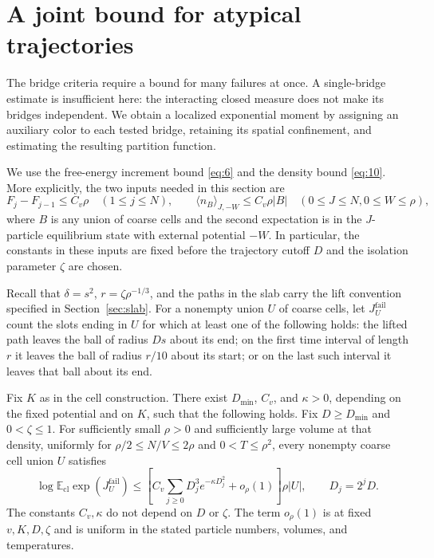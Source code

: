 \section{A joint bound for atypical trajectories}
\label{sec:atypical}

The bridge criteria require a bound for many failures at once.  A
single-bridge estimate is insufficient here: the interacting closed measure
does not make its bridges independent.  We obtain a localized exponential
moment by assigning an auxiliary color to each tested bridge, retaining its
spatial confinement, and estimating the resulting partition function.

We use the free-energy increment bound \eqref{eq:6} and the density bound
\eqref{eq:10}.  More explicitly, the two inputs needed in this section are
\[
 F_j-F_{j-1}\le C_v\rho\quad(1\le j\le N),
 \qquad
 \langle n_B\rangle_{J,-W}\le C_v\rho|B|
 \quad(0\le J\le N, 0\le W\le\rho),
\]
where $B$ is any union of coarse cells and the second expectation is in the
$J$-particle equilibrium state with external potential $-W$.  In particular,
the constants in these inputs are fixed before the trajectory cutoff $D$
and the isolation parameter $\zeta$ are chosen.

Recall that $\delta=s^2$, $r=\zeta\rho^{-1/3}$, and the paths in the slab
carry the lift convention specified in Section~\ref{sec:slab}.  For a
nonempty union $U$ of coarse cells, let $J_U^{\mathrm{fail}}$ count the
slots ending in $U$ for which at least one of the following holds: the
lifted path leaves the ball of radius $Ds$ about its end; on the first
time interval of length $r$ it leaves the ball of radius $r/10$ about
its start; or on the last such interval it leaves that ball about its
end.

\begin{proposition}
\label{prop:atypical-moment}
Fix $K$ as in the cell construction.  There exist $D_{\min}$, $C_v$, and
$\kappa>0$, depending on the fixed potential and on $K$, such that the
following holds.  Fix $D\ge D_{\min}$ and $0<\zeta\le1$.  For sufficiently
small $\rho>0$ and sufficiently large volume at that density, uniformly
for $\rho/2\le N/V\le2\rho$ and $0<T\le\rho^2$, every nonempty coarse
cell union $U$ satisfies
\begin{equation}
 \log\mathbb E_{\mathrm{cl}}\exp(J_U^{\mathrm{fail}})
 \le
 \left[C_v\sum_{j\ge0}D_j^3e^{-\kappa D_j^2}
       +o_\rho(1)\right]\rho|U|,
 \qquad D_j=2^jD.
 \tag{17}\label{eq:17}
\end{equation}
The constants $C_v,\kappa$ do not depend on $D$ or $\zeta$.  The term
$o_\rho(1)$ is at fixed $v,K,D,\zeta$ and is uniform in the stated
particle numbers, volumes, and temperatures.
\end{proposition}

